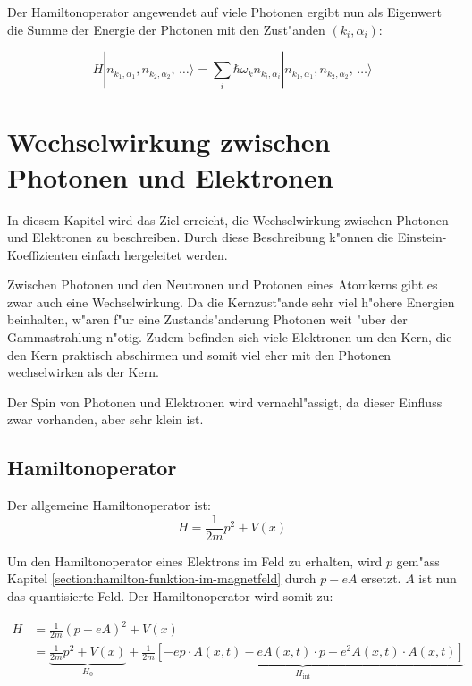 Der Hamiltonoperator angewendet auf viele Photonen ergibt nun als Eigenwert die Summe der Energie der Photonen mit den Zust"anden $(k_i,\alpha_i)$:

\begin{equation*}
H |n_{k_1,\alpha_1}, n_{k_2,\alpha_2}, \, \hdots\rangle = \sum_i \hbar \omega_k n_{k_i,\alpha_i} |n_{k_1,\alpha_1}, n_{k_2,\alpha_2}, \, \hdots\rangle
\end{equation*}

\section{Wechselwirkung zwischen Photonen und Elektronen}

In diesem Kapitel wird das Ziel erreicht, die Wechselwirkung zwischen Photonen und Elektronen zu beschreiben. Durch diese Beschreibung k"onnen die Einstein-Koeffizienten einfach hergeleitet werden.

Zwischen Photonen und den Neutronen und Protonen eines Atomkerns gibt es zwar auch eine Wechselwirkung. Da die Kernzust"ande sehr viel h"ohere Energien beinhalten, w"aren f"ur eine Zustands"anderung Photonen weit "uber der Gammastrahlung n"otig. Zudem befinden sich viele Elektronen um den Kern, die den Kern praktisch abschirmen und somit viel eher mit den Photonen wechselwirken als der Kern.

Der Spin von Photonen und Elektronen wird vernachl"assigt, da dieser Einfluss zwar vorhanden, aber sehr klein ist.

\subsection{Hamiltonoperator}

Der allgemeine Hamiltonoperator ist:
\begin{equation*}
H = \frac{1}{2m}p^2 + V(x)
\end{equation*}

Um den Hamiltonoperator eines Elektrons im Feld zu erhalten, wird $p$ gem"ass Kapitel \ref{section:hamilton-funktion-im-magnetfeld} durch $p - eA$ ersetzt. $A$ ist nun das quantisierte Feld. Der Hamiltonoperator wird somit zu:

\begin{equation*}
\begin{split}
H &= \frac{1}{2m}(p - eA)^2 + V(x)\\
 &= \underbrace{\frac{1}{2m}p^2 + V(x)}_{H_0} + \underbrace{\frac{1}{2m}\left[- e p \cdot A(x, t) - e A(x, t) \cdot p + e^2 A(x, t) \cdot A(x, t) \right]}_{H_{\text{int}}}
\end{split}
\end{equation*}

